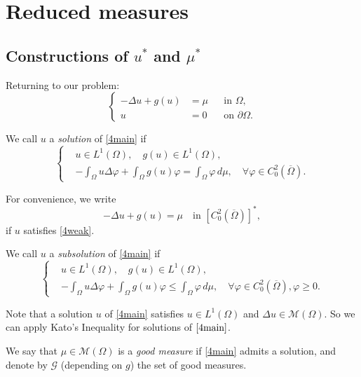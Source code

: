\documentclass[a4paper, 11pt]{report}
\theoremstyle{definition}\newtheorem*{rmk}{Remark}
\begin{document}
\chapter{Reduced measures}

\section{\texorpdfstring{Constructions of $u^*$ and $\mu^*$}{Constructions of u* and mu*}}
\mbox{}

Returning to our problem:
\begin{equation}\label{4main}
\left\{
\begin{aligned}
-\Delta u + g(u) & = \mu && \text{in } \Omega , \\
u & = 0 && \text{on } \partial \Omega.
\end{aligned}
\right.
\end{equation}

We call $u$ a \emph{solution} of \eqref{4main} if
\begin{equation}\label{4weak}
\left\{
\begin{aligned}
& u \in L^1(\Omega ),\quad g(u) \in L^1(\Omega ) ,\\
&-\int_{\Omega} u \Delta \varphi + \int_{\Omega} g(u)\varphi = \int_{\Omega}\varphi\, d\mu, \quad \forall \varphi \in C^2_0(\overline{\Omega}) .
\end{aligned}
\right.
\end{equation}

For convenience, we write
\[
-\Delta u +g(u) = \mu \quad\text{in }[C^2_0(\overline{\Omega})]^*,
\]
if $u$ satisfies \ref{4weak}.

We call $u$ a \emph{subsolution} of \eqref{4main} if
\[
\left\{
\begin{aligned}
& u \in L^1(\Omega ),\quad g(u) \in L^1(\Omega ) ,\\
&-\int_{\Omega} u \Delta \varphi + \int_{\Omega} g(u)\varphi \le \int_{\Omega}\varphi \, d\mu,\quad \forall \varphi \in C^2_0(\overline{\Omega}),\varphi \ge 0 .
\end{aligned}
\right.
\]

Note that a solution $u$ of \eqref{4main} satisfies $u\in L^1(\Omega)$ and $\Delta u \in \mathcal{M}(\Omega)$. So we can apply Kato's Inequality for solutions of $\eqref{4main}$.

We say that $\mu \in \mathcal{M}(\Omega)$ is a \emph{good measure} if \eqref{4main} admits a solution, and denote by $\mathcal{G}$ (depending on $g$) the set of good measures.
\end{document}

